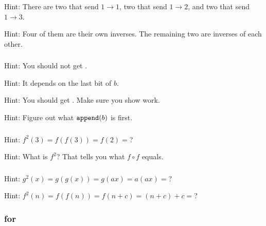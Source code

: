 \subsubsection*{ \answers}
\begin{apart}
    \item Hint: There are two that send $1 \to 1$, two that send $1 \to 2$, and two that send $1 \to 3$.
    \item Hint: Four of them are their own inverses.  The remaining two are inverses of each other.
\end{apart}

\subsubsection*{ \answers}
\begin{apart}
    \item Hint: You should not get .
    \item Hint: It depends on the last bit of $b$.
    \item Hint: You should get . Make sure you show work.
    \item Hint: Figure out what $\texttt{append}(b)$ is first.
\end{apart}

\subsubsection*{ \answers}
\begin{apart}
    \item Hint: $f^2(3) = f(f(3))=f(2)=$?
    \item Hint: What is $f^2$? That tells you what $f \circ f$ equals.
\end{apart}

\subsubsection*{ \answers}
\begin{apart}
    \item Hint: $g^2(x) =g(g(x))=g(ax)=a(ax) =$?
    \item Hint: $f^2(n)=f(f(n))=f(n+c)=(n+c)+c=$?
\end{apart}

\subsubsection{\answers for  \subpffunique}

